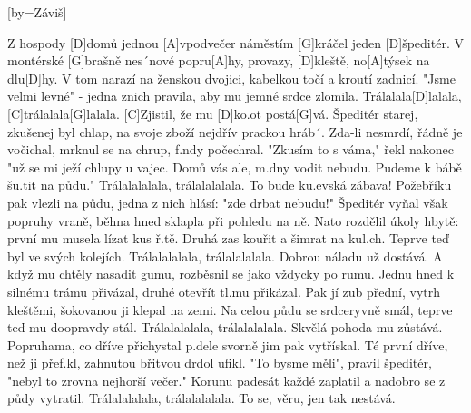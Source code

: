 
[by={Záviš}]

\beginverse 
Z hospody [D]domů jednou [A]vpodvečer
náměstím [G]kráčel jeden [D]špeditér.
V montérské [G]brašně nes´nové popru[A]hy,
provazy, [D]kleště, no[A]týsek na dlu[D]hy.
\endverse
\beginverse 
V tom narazí na ženskou dvojici,
kabelkou točí a kroutí zadnicí.
"Jsme velmi levné" - jedna znich pravila,
aby mu jemné srdce zlomila.
\endverse
\beginchorus
[G]Trálalala[D]lalala, [C]trálalala[G]lalala.
[C]Zjistil, že mu [D]ko.ot postá[G]vá.
\endchorus
\beginverse
Špeditér starej, zkušenej byl chlap,
na svoje zboží nejdřív prackou hráb´.
Zda-li nesmrdí, řádně je vočichal,
mrknul se na chrup, f.ndy počechral.
\endverse
\beginverse
"Zkusím to s váma," řekl nakonec
"už se mi ježí chlupy u vajec.
Domů vás ale, m.dny vodit nebudu.
Pudeme k bábě šu.tit na půdu."
\endverse
\beginchorus
Trálalalalala, trálalalalala.
To bude ku.evská zábava!
\endchorus
\beginverse
Požebříku pak vlezli na půdu,
jedna z nich hlásí: "zde drbat nebudu!"
Špeditér vyňal však popruhy vraně,
běhna hned sklapla při pohledu na ně.
\endverse
\beginverse
Nato rozdělil úkoly hbytě:
první mu musela lízat kus ř.tě.
Druhá zas kouřit a šimrat na kul.ch.
Teprve teď byl ve svých kolejích.
\endverse
\beginchorus
Trálalalalala, trálalalalala.
Dobrou náladu už dostává.
\endchorus
\beginverse
A když mu chtěly nasadit gumu,
rozběsnil se jako vždycky po rumu.
Jednu hned k silnému trámu přivázal,
druhé otevřít tl.mu přikázal.
\endverse
\beginverse
Pak jí zub přední, vytrh kleštěmi,
šokovanou ji klepal na zemi.
Na celou půdu se srdceryvně smál,
teprve teď mu doopravdy stál.
\endverse
\beginchorus
Trálalalalala, trálalalalala.
Skvělá pohoda mu zůstává.
\endchorus
\beginverse
Popruhama, co dříve přichystal
p.dele svorně jim pak vytřískal.
Té první dříve, než ji přef.kl,
zahnutou břitvou drdol ufikl.
\endverse
\beginverse
"To bysme měli", pravil špeditér,
"nebyl to zrovna nejhorší večer."
Korunu padesát každé zaplatil
a nadobro se z půdy vytratil.
\endverse
\beginchorus
Trálalalalala, trálalalalala.
To se, věru, jen tak nestává.
\endchorus

\endsong

